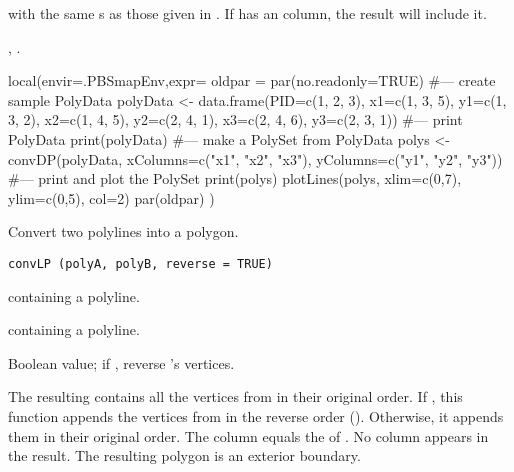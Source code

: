 \documentclass[letterpaper]{book}
\begin{document}
%
\begin{Value}
 with the same s as those given in .  If
 has an  column, the result will include it.
\end{Value}
%
\begin{SeeAlso}\relax
{},
.
\end{SeeAlso}
%
\begin{Examples}
\begin{ExampleCode}
local(envir=.PBSmapEnv,expr={
  oldpar = par(no.readonly=TRUE)
  #--- create sample PolyData
  polyData <- data.frame(PID=c(1, 2, 3),
     x1=c(1, 3, 5), y1=c(1, 3, 2),
     x2=c(1, 4, 5), y2=c(2, 4, 1),
     x3=c(2, 4, 6), y3=c(2, 3, 1))
  #--- print PolyData
  print(polyData)
  #--- make a PolySet from PolyData
  polys <- convDP(polyData,
    xColumns=c("x1", "x2", "x3"),
    yColumns=c("y1", "y2", "y3"))
  #--- print and plot the PolySet
  print(polys)
  plotLines(polys, xlim=c(0,7), ylim=c(0,5), col=2)
  par(oldpar)
})
\end{ExampleCode}
\end{Examples}
%
\begin{Description}\relax
Convert two polylines into a polygon.
\end{Description}
%
\begin{Usage}
\begin{verbatim}
convLP (polyA, polyB, reverse = TRUE)
\end{verbatim}
\end{Usage}
%
\begin{Arguments}
\begin{ldescription}
\item[\code{polyA}]  containing a polyline.
\item[\code{polyB}]  containing a polyline.
\item[\code{reverse}] Boolean value; if , reverse 's
vertices.
\end{ldescription}
\end{Arguments}
%
\begin{Details}\relax
The resulting  contains all the vertices from
 in their original order.  If , this
function appends the vertices from  in the reverse order
().  Otherwise, it appends them in their original
order.  The  column equals the  of .
No  column appears in the result.  The resulting polygon is
an exterior boundary.
\end{Details}
\end{document}
